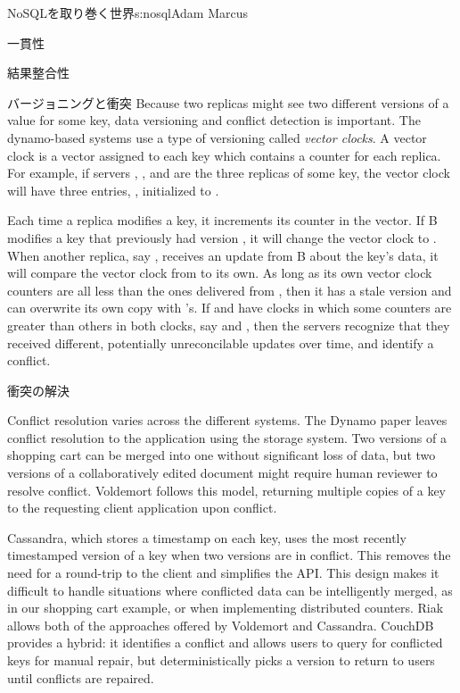 \begin{aosachapter}{NoSQLを取り巻く世界}{s:nosql}{Adam Marcus}
\begin{aosasect1}{一貫性}
\begin{aosasect2}{結果整合性}
\begin{aosasect3}{バージョニングと衝突}
Because two replicas might see two different versions of a value for
some key, data versioning and conflict detection is important.  The
dynamo-based systems use a type of versioning called \emph{vector
clocks}.  A vector clock is a vector assigned to each key which
contains a counter for each replica.  For example, if
servers , , and  are the three replicas of
some key, the vector clock will have three entries, , initialized to .

Each time a replica modifies a key, it increments its counter in the
vector.  If B modifies a key that previously had version , it will change the vector clock to .  When
another replica, say , receives an update from B about the
key's data, it will compare the vector clock from  to its own.
As long as its own vector clock counters are all less than the ones
delivered from , then it has a stale version and can overwrite
its own copy with 's.  If  and  have clocks in
which some counters are greater than others in both clocks, say
 and , then the servers recognize
that they received different, potentially unreconcilable updates over
time, and identify a conflict.

\end{aosasect3}

\begin{aosasect3}{衝突の解決}

Conflict resolution varies across the different systems.  The Dynamo
paper leaves conflict resolution to the application using the
storage system.  Two versions of a shopping cart can be merged into
one without significant loss of data, but two versions of a
collaboratively edited document might require human reviewer to
resolve conflict.  Voldemort follows this model, returning multiple
copies of a key to the requesting client application upon conflict.

Cassandra, which stores a timestamp on each key, uses the most
recently timestamped version of a key when two versions are in
conflict.  This removes the need for a round-trip to the client and
simplifies the API. This design makes it difficult to handle
situations where conflicted data can be intelligently merged, as in
our shopping cart example, or when implementing distributed counters.
Riak allows both of the approaches offered by Voldemort and Cassandra.
CouchDB provides a hybrid: it identifies a conflict and allows users
to query for conflicted keys for manual repair, but deterministically
picks a version to return to users until conflicts are repaired.


\end{aosasect3}
\end{aosasect2}
\end{aosasect1}
\end{aosachapter}
